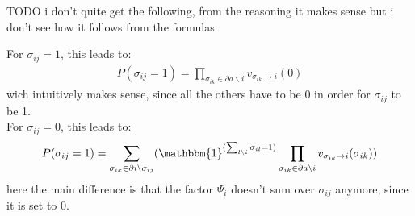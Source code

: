 \documentclass[a4paper]{scrartcl}
\begin{document}
{
\color{green}
TODO i don't quite get the following, from the reasoning it makes sense but i don't see how it follows from the formulas


For $\sigma_{ij}=1$, this leads to:
\begin{align}
    P(\sigma_{ij}=1) =  \prod_{\sigma_{ik} \in \partial a \backslash i} v_{\sigma_{ik} \rightarrow i}(0)
\end{align}
wich intuitively makes sense, since all the others have to be 0 in order for $\sigma_{ij}$ to be 1.\\
For $\sigma_{ij}=0$, this leads to:
\begin{align}
    P(\sigma_{ij}=1) = \sum_{\sigma_{ik} \in \partial i \backslash \sigma_{ij}} (\mathbbm{1}^{(\sum_{l \backslash i} \sigma_{il} = 1)} \prod_{\sigma_{ik} \in \partial a \backslash i} v_{\sigma_{ik} \rightarrow i}(\sigma_{ik}))\\
\end{align}
here the main difference is that the factor $\Psi_{i}$ doesn't sum over $\sigma_{ij}$ anymore, since it is set to 0.
}
\end{document}

